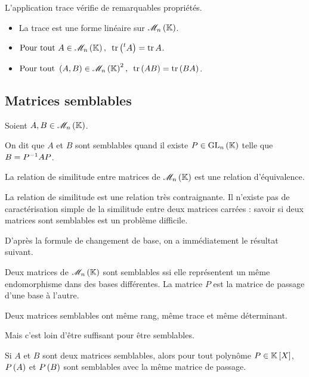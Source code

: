 L'application trace vérifie de remarquables propriétés.

\begin{prop}
\begin{itemize}
    \item La trace est une forme linéaire sur \(\M{n}\). \\
    \item \(\quantifs{\Tpt A\in\M{n}}\tr\paren{\trans{A}}=\tr A\). \\
    \item \(\quantifs{\Tpt\paren{A,B}\in\M{n}^2}\tr\paren{AB}=\tr\paren{BA}\).
\end{itemize}
\end{prop}

\subsection{Matrices semblables}

\begin{defi}
Soient \(A,B\in\M{n}\).

On dit que \(A\) et \(B\) sont semblables quand il existe \(P\in\GL{n}\) telle que \(B=P^{-1} AP\).
\end{defi}

\begin{prop}
La relation de similitude entre matrices de \(\M{n}\) est une relation d'équivalence.
\end{prop}

La relation de similitude est une relation très contraignante. Il n'existe pas de caractérisation simple de la similitude entre deux matrices carrées : savoir si deux matrices sont semblables est un problème difficile.

D'après la formule de changement de base, on a immédiatement le résultat suivant.

\begin{prop}
Deux matrices de \(\M{n}\) sont semblables ssi elle représentent un même endomorphisme dans des bases différentes. La matrice \(P\) est la matrice de passage d'une base à l'autre.
\end{prop}

\begin{cor}
Deux matrices semblables ont même rang, même trace et même déterminant.
\end{cor}

Mais c'est loin d'être suffisant pour être semblables.

\begin{prop}
Si \(A\) et \(B\) sont deux matrices semblables, alors pour tout polynôme \(P\in\poly\), \(P\left(A\right)\) et \(P\left(B\right)\) sont semblables avec la même matrice de passage.
\end{prop}

